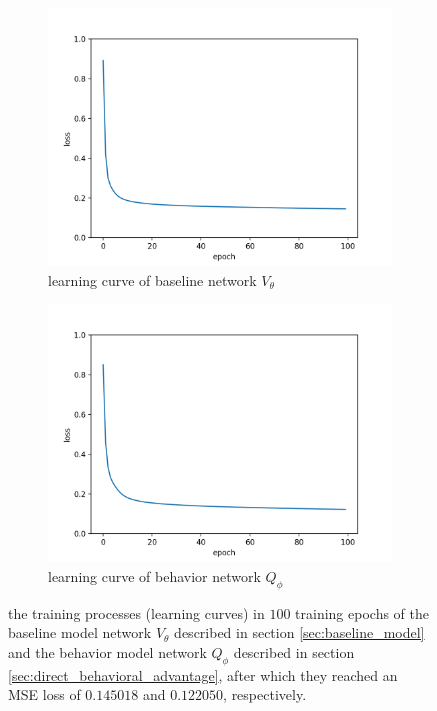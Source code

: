 \documentclass{article}
\begin{document}
\begin{figure}[H]
    \centering
    \begin{subfigure}{0.45\textwidth}
        \centering
        \includegraphics[width=\linewidth]{figures/training_value_model.png}
        \caption{learning curve of baseline network $ V_{\theta} $}
        \label{fig:training_value_model}
    \end{subfigure}
    \begin{subfigure}{0.45\textwidth}
        \centering
        \includegraphics[width=\linewidth]{figures/training_behavior_model.png}
        \caption{learning curve of behavior network $ Q_{\phi} $}
        \label{fig:training_behavior_model}
    \end{subfigure}
    \caption{the training processes (learning curves) in $ 100 $ training epochs of the baseline model network $ V_{\theta} $ described in section \ref{sec:baseline_model} and the behavior model network $ Q_{\phi} $ described in section \ref{sec:direct_behavioral_advantage}, after which they reached an MSE loss of $ 0.145018 $ and $ 0.122050 $, respectively.}
    \label{fig:training_models}
\end{figure}
\end{document}
